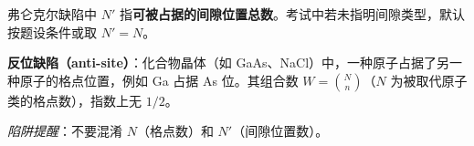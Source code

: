 \begin{thinkbox}
弗仑克尔缺陷中 $N'$ 指\textbf{可被占据的间隙位置总数}。考试中若未指明间隙类型，默认按题设条件或取 $N'=N$。

\textbf{反位缺陷（anti-site）}：化合物晶体（如 GaAs、NaCl）中，一种原子占据了另一种原子的格点位置，例如 Ga 占据 As 位。其组合数 $W=\binom{N}{n}$（$N$ 为被取代原子类的格点数），指数上无 $1/2$。

\textit{陷阱提醒}：不要混淆 $N$（格点数）和 $N'$（间隙位置数）。
\end{thinkbox}
